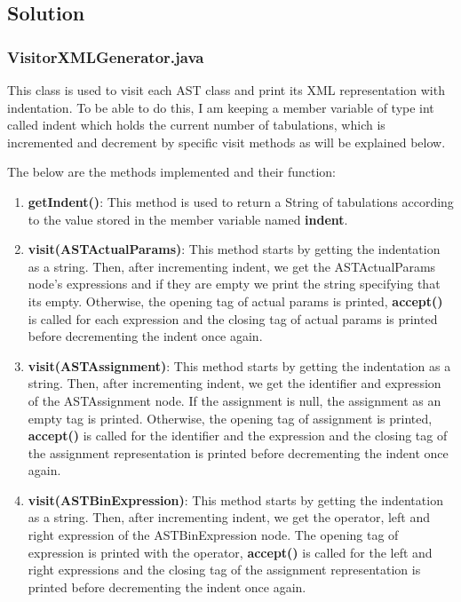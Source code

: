 \documentclass{article}
\begin{document}
				\subsection{Solution}
				\subsubsection{VisitorXMLGenerator.java}
				This class is used to visit each AST class and print its XML representation with indentation. To be able to do this, I am keeping a member variable of type int called indent which holds the current number of tabulations, which is incremented and decrement by specific visit methods as will be explained below.
				
				The below are the methods implemented and their function:
				
				\begin{enumerate}
				\item \textbf{getIndent()}: This method is used to return a String of tabulations according to the value stored in the member variable named \textbf{indent}. 
				\item \textbf{visit(ASTActualParams)}: This method starts by getting the indentation as a string. Then, after incrementing indent, we get the ASTActualParams node's expressions and if they are empty we print the string specifying that its empty. Otherwise, the opening tag of actual params is printed, \textbf{accept()} is called for each expression and the closing tag of actual params is printed before decrementing the indent once again.
				
					\item \textbf{visit(ASTAssignment)}: This method starts by getting the indentation as a string. Then, after incrementing indent, we get the identifier and expression of the ASTAssignment node. If the assignment is null, the assignment as an empty tag is printed. Otherwise, the opening tag of assignment is printed, \textbf{accept()} is called for the identifier and the expression and the closing tag of the assignment representation is printed before decrementing the indent once again.
			
					\item \textbf{visit(ASTBinExpression)}: This method starts by getting the indentation as a string. Then, after incrementing indent, we get the operator, left and right expression of the ASTBinExpression node.  The opening tag of expression is printed with the operator, \textbf{accept()} is called for the left and right expressions and the closing tag of the assignment representation is printed before decrementing the indent once again.		
			

\end{enumerate}
\end{document}
